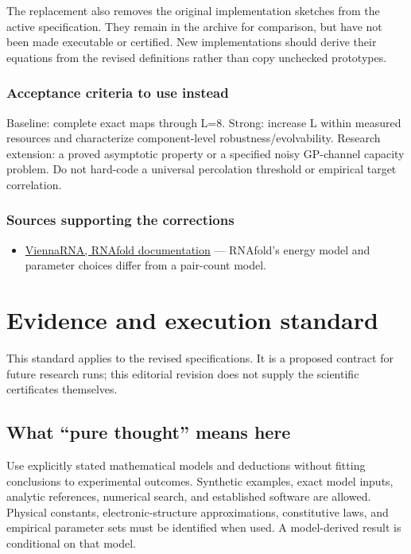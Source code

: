 \documentclass[
  11pt,
]{article}
\providecommand{\tightlist}{%
  \setlength{\itemsep}{0pt}\setlength{\parskip}{0pt}}
\begin{document}
The replacement also removes the original implementation sketches from
the active specification. They remain in the archive for comparison, but
have not been made executable or certified. New implementations should
derive their equations from the revised definitions rather than copy
unchecked prototypes.

\subsubsection{Acceptance criteria to use instead}

Baseline: complete exact maps through L=8. Strong: increase L within
measured resources and characterize component-level
robustness/evolvability. Research extension: a proved asymptotic
property or a specified noisy GP-channel capacity problem. Do not
hard-code a universal percolation threshold or empirical target
correlation.

\subsubsection{Sources supporting the corrections}

\begin{itemize}
\tightlist
\item
  \href{https://www.tbi.univie.ac.at/RNA/RNAfold}{ViennaRNA, RNAfold
  documentation} --- RNAfold's energy model and parameter choices differ
  from a pair-count model.
\end{itemize}

\section{Evidence and execution standard}

This standard applies to the revised specifications. It is a proposed
contract for future research runs; this editorial revision does not
supply the scientific certificates themselves.

\subsection{What ``pure thought'' means here}

Use explicitly stated mathematical models and deductions without fitting
conclusions to experimental outcomes. Synthetic examples, exact model
inputs, analytic references, numerical search, and established software
are allowed. Physical constants, electronic-structure approximations,
constitutive laws, and empirical parameter sets must be identified when
used. A model-derived result is conditional on that model.
\end{document}
